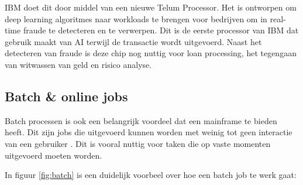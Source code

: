 IBM doet dit door middel van een nieuwe Telum Processor. Het is ontworpen om deep learning algoritmes naar workloads te brengen voor bedrijven om in real-time fraude te detecteren en te verwerpen. Dit is de eerste processor van IBM dat gebruik maakt van AI terwijl de transactie wordt uitgevoerd. Naast het detecteren van fraude is deze chip nog nuttig voor loan processing, het tegengaan van witwassen van geld en risico analyse. \autocite{IBM2021a} \\

\subsection{Batch \& online jobs}
Batch processen is ook een belangrijk voordeel dat een mainframe te bieden heeft. Dit zijn jobs die uitgevoerd kunnen worden met weinig tot geen interactie van een gebruiker \autocite{IBM}. Dit is vooral nuttig voor taken die op vaste momenten uitgevoerd moeten worden.

In figuur \ref{fig:batch} is een duidelijk voorbeel over hoe een batch job te werk gaat:

